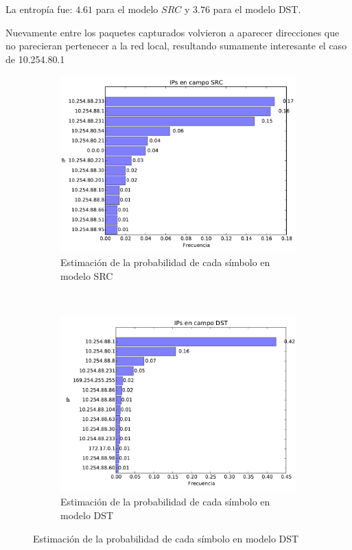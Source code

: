 La entrop\'ia fue: $4.61$ para el modelo $SRC$ y $3.76$ para el modelo
DST.


Nuevamente entre los paquetes capturados volvieron a aparecer direcciones que
no parecieran pertenecer a la red local, resultando sumamente interesante el caso
de 10.254.80.1


\begin{figure}[H]
	\center
	\begin{subfigure}{0.4\textwidth}
		\includegraphics[width=1.0\textwidth]{resultados/starbucks/ipsSrc_4_6187931499.pdf}
		\caption{Estimaci\'on de la probabilidad de cada s\'imbolo en modelo SRC}
	\end{subfigure}
	~
	\begin{subfigure}{0.4\textwidth}
		\includegraphics[width=1.0\textwidth]{resultados/starbucks/ipsDst_3_76848714287.pdf}
		\caption{Estimaci\'on de la probabilidad de cada s\'imbolo en modelo DST}
	\end{subfigure}
\end{figure}

